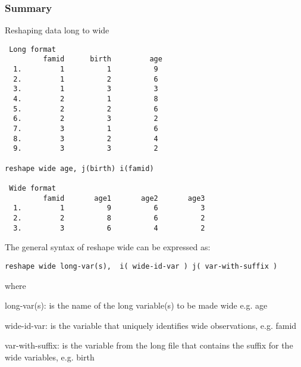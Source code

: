 \subsubsection{Summary}
\begin{compactitem}
\item Reshaping data long to wide
\begin{lstlisting}
 Long format
         famid      birth         age
  1.         1          1          9
  2.         1          2          6
  3.         1          3          3
  4.         2          1          8
  5.         2          2          6
  6.         2          3          2
  7.         3          1          6
  8.         3          2          4
  9.         3          3          2

reshape wide age, j(birth) i(famid)

 Wide format
         famid       age1       age2       age3
  1.         1          9          6          3
  2.         2          8          6          2
  3.         3          6          4          2
\end{lstlisting}

\item The general syntax of reshape wide can be expressed as:
\begin{lstlisting}
reshape wide long-var(s),  i( wide-id-var ) j( var-with-suffix )
\end{lstlisting}
where
\begin{compactitem}
\item long-var(s): is the name of the long variable(s) to be made wide e.g. age
\item wide-id-var: is the variable that uniquely identifies wide observations, e.g. famid
\item var-with-suffix: is the variable from the long file that contains the suffix for the wide variables, e.g. birth
\end{compactitem}
\end{compactitem}
